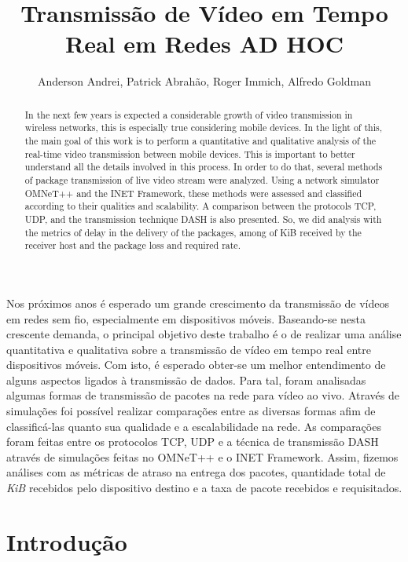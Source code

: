 \documentclass[12pt]{article}
\title{Transmissão de Vídeo em Tempo Real em Redes AD HOC}
\author{Anderson Andrei\inst{1}, Patrick Abrahão\inst{1}, Roger Immich\inst{2}, Alfredo Goldman\inst{1}}
\begin{document}
 

\maketitle

\begin{abstract}
In the next few years is expected a considerable growth of video transmission in wireless networks, this is especially true considering mobile devices. In the light of this, the main goal of this work is to perform a quantitative and qualitative analysis of the real-time video transmission between mobile devices. This is important to better understand all the details involved in this process.
In order to do that, several methods of package transmission of live video stream were analyzed. Using a network simulator OMNeT++ and the INET Framework, these methods were assessed and classified according to their qualities and scalability. A comparison between the protocols TCP, UDP, and the transmission technique DASH is also presented. So, we did analysis with the metrics of delay in the delivery of the packages, among of KiB received by the receiver host and the package loss and required rate.
\end{abstract}
     
\begin{resumo}
Nos próximos anos é esperado um grande crescimento da transmissão de vídeos em redes sem fio, especialmente em dispositivos móveis.
Baseando-se nesta crescente demanda, o principal objetivo deste trabalho é o de realizar uma análise quantitativa e qualitativa sobre a transmissão de vídeo em tempo real entre dispositivos móveis. Com isto, é esperado obter-se um melhor entendimento de alguns aspectos ligados à transmissão de dados. Para tal, foram analisadas algumas formas de transmissão de pacotes na rede para vídeo ao vivo. Através de simulações foi possível realizar comparações entre as diversas formas afim de classificá-las quanto sua qualidade e a escalabilidade na rede. As comparações foram feitas entre os protocolos TCP, UDP e a técnica de transmissão DASH através de simulações feitas no OMNeT++ e o INET Framework. Assim, fizemos análises com as métricas de atraso na entrega dos pacotes, quantidade total de \textit{KiB} recebidos pelo dispositivo destino e a taxa de pacote recebidos e requisitados.
\end{resumo}

\section{Introdução} \label{sec:introducao}
	
\end{document}
